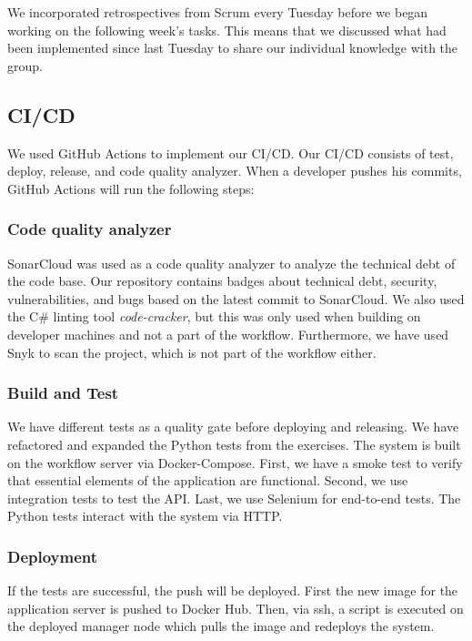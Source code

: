 We incorporated retrospectives from Scrum every Tuesday before we began working on the following week's tasks. This means that we discussed what had been implemented since last Tuesday to share our individual knowledge with the group.

\subsection{CI/CD}
We used GitHub Actions to implement our CI/CD. Our CI/CD consists of test, deploy, release, and code quality analyzer. When a developer pushes his commits, GitHub Actions will run the following steps:

\subsubsection{Code quality analyzer}
SonarCloud was used as a code quality analyzer to analyze the technical debt of the code base. Our repository contains badges about technical debt, security, vulnerabilities, and bugs based on the latest commit to SonarCloud. We also used the C\# linting tool \textit{code-cracker}, but this was only used when building on developer machines and not a part of the workflow. Furthermore, we have used Snyk to scan the project, which is not part of the workflow either.

\subsubsection{Build and Test}
We have different tests as a quality gate before deploying and releasing. We have refactored and expanded the Python tests from the exercises. The system is built on the workflow server via Docker-Compose. First, we have a smoke test to verify that essential elements of the application are functional. Second, we use integration tests to test the API. Last, we use Selenium for end-to-end tests. The Python tests interact with the system via HTTP.

\subsubsection{Deployment}
If the tests are successful, the push will be deployed. First the new image for the application server is pushed to Docker Hub. Then, via ssh, a script is executed on the deployed manager node which pulls the image and redeploys the system.


